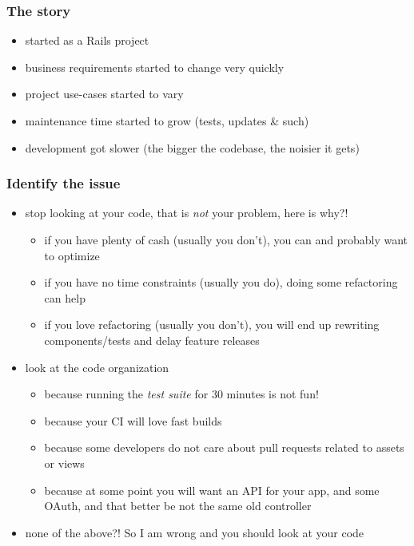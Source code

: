 \documentclass[compress]{beamer}
\begin{document}
\begin{frame}
\frametitle{The story}

\begin{itemize}[<+->]
  \item started as a Rails project
  \item business requirements started to change very quickly
  \item project use-cases started to vary
  \item maintenance time started to grow (tests, updates \& such)
  \item development got slower (the bigger the codebase, the noisier it gets)
\end{itemize}
\end{frame}

\begin{frame}
\frametitle{Identify the issue}

\begin{itemize}[<+->]
  \item stop looking at your code, that is \emph{not} your problem, here is why?!
    \begin{itemize}
      \item if you have plenty of cash (usually you don't), you can and probably want to optimize
      \item if you have no time constraints (usually you do), doing some refactoring can help
      \item if you love refactoring (usually you don't), you will end up rewriting components/tests and delay feature releases
    \end{itemize}
  \item look at the code organization
    \begin{itemize}
      \item because running the \emph{test suite} for 30 minutes is not fun!
      \item because your CI will love fast builds
      \item because some developers do not care about pull requests related to assets or views
      \item because at some point you will want an API for your app, and some OAuth, and that better be not the same old controller
    \end{itemize}
  \item none of the above?! So I am wrong and you should look at your code
\end{itemize}
\end{frame}
\end{document}
